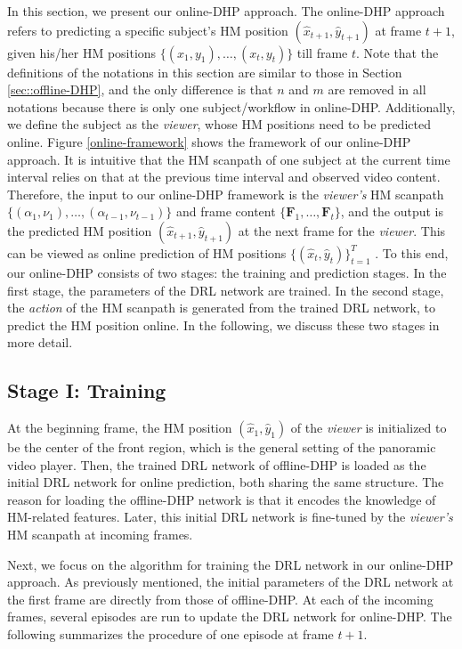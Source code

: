 \documentclass[10pt,journal,compsoc]{IEEEtran}
\begin{document}
In this section, we present our online-DHP approach.
The online-DHP approach refers to predicting a specific subject's HM position $(\hat{x}_{t+1},\hat{y}_{t+1})$ at frame $t+1$, given his/her HM positions $\{(x_{1},y_{1}),\ldots, (x_{t},y_{t})\}$ till frame $t$.
Note that the definitions of the notations in this section are similar to those in Section \ref{sec::offline-DHP}, and the only difference is that $n$ and $m$ are removed in all notations because there is only one subject/workflow in online-DHP.
Additionally, we define the subject as the \textit{viewer}, whose HM positions need to be predicted online. %
Figure \ref{online-framework} shows the framework of our online-DHP approach. %
It is intuitive that the HM scanpath of one subject at the current time
interval relies on that at the previous time interval and observed
video content.
Therefore, the input to our online-DHP framework is the \textit{viewer's} HM scanpath $\{(\alpha_1,\nu_1),\ldots, (\alpha_{t-1},\nu_{t-1})\}$ and frame content $\{\mathbf{F}_1, \ldots, \mathbf{F}_t \}$, and the output is the predicted HM position $(\hat{x}_{t+1},\hat{y}_{t+1})$ at the next frame for the \textit{viewer}.
This can be viewed as online prediction of HM positions $\{(\hat{x}_{t},\hat{y}_{t})\}_{t=1}^{T}$ . To this end, our online-DHP consists of two stages: the training and prediction stages.
In the first stage, the parameters of the DRL network are trained.
In the second stage, the \textit{action} of the HM scanpath is generated from the trained DRL network, to predict the HM position online.
In the following, we discuss these two stages in more detail.

\subsection{Stage I: Training}
At the beginning frame, the HM position $(\hat{x}_1,\hat{y}_1)$ of the \textit{viewer} is initialized to be the center of the front region, which is the general setting of  the panoramic video player. Then, the trained DRL network of offline-DHP is loaded as the initial DRL network for online prediction, both sharing the same structure.
The reason for loading the offline-DHP network is that it encodes the knowledge of HM-related features.
Later, this initial DRL network is fine-tuned by the \textit{viewer's} HM scanpath at incoming frames.

Next, we focus on the algorithm for training the DRL network in our online-DHP approach. As previously mentioned, the initial parameters of the DRL network at the first frame are directly from those of offline-DHP. At each of the incoming frames, several episodes are run to update the DRL network for online-DHP. The following summarizes the procedure of one episode at frame $t+1$.
\end{document}
